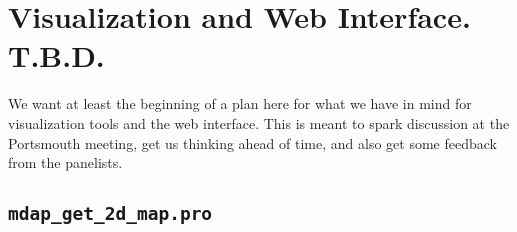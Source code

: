 \documentclass[11pt]{book}
\begin{document}
%
%
%
%


\section{Visualization and Web Interface. T.B.D.}
\label{dap_sec:visualization}

We want at least the beginning of a plan here for what we have in mind
for visualization tools and the web interface.  This is meant to spark
discussion at the Portsmouth meeting, get us thinking ahead of time,
and also get some feedback from the panelists.


\subsection{{\tt mdap\_get\_2d\_map.pro}}
\label{dap_sec:mdap_get_2d_map}
\end{document}
